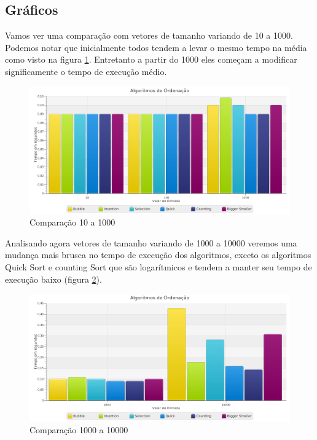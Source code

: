 \subsection{Gráficos}

Vamos ver uma comparação com vetores de tamanho variando de 10 a 1000.
Podemos notar que inicialmente todos tendem a levar o mesmo tempo na
média como visto na figura \ref{fig:chart1}. Entretanto a partir do 1000
eles começam a modificar significamente o tempo de execução médio.

\begin{figure}[b]
   \includegraphics[scale=0.47]{img/charts/chart-1.png}
   \caption{Comparação 10 a 1000}
   \label{fig:chart1}
\end{figure}

Analisando agora vetores de tamanho variando de 1000 a 10000 veremos uma
mudança mais brusca no tempo de execução dos algoritmos, exceto os
algoritmos Quick Sort e counting Sort que são logarítmicos e tendem a
manter seu tempo de execução baixo (figura \ref{fig:chart2}).

\begin{figure}[h]
   \includegraphics[scale=0.47]{img/charts/chart-2.png}
   \caption{Comparação 1000 a 10000}
   \label{fig:chart2}
\end{figure}

